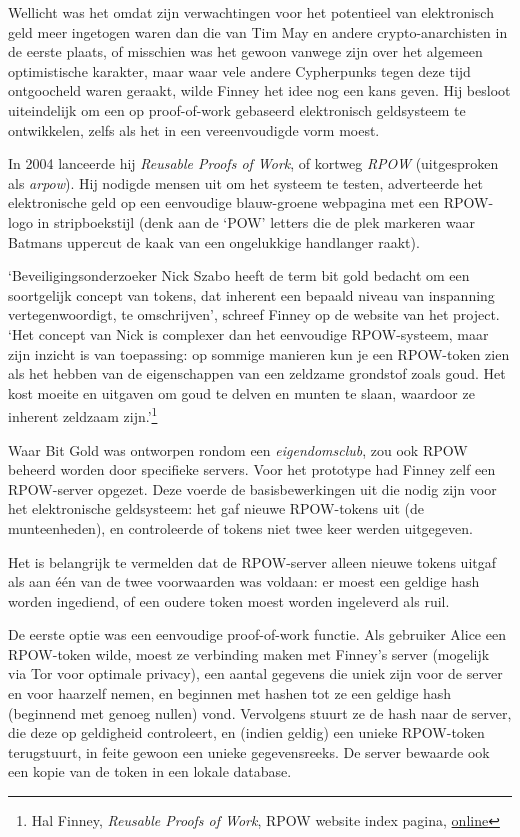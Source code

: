 \documentclass[
  a5paper,
  smalldemyvopaper,11pt,twoside,onecolumn,openright,extrafontsizes,
hidelinks]{memoir}
\begin{document}
Wellicht was het omdat zijn verwachtingen voor het potentieel van
elektronisch geld meer ingetogen waren dan die van Tim May en andere
crypto-anarchisten in de eerste plaats, of misschien was het gewoon
vanwege zijn over het algemeen optimistische karakter, maar waar vele
andere Cypherpunks tegen deze tijd ontgoocheld waren geraakt, wilde
Finney het idee nog een kans geven. Hij besloot uiteindelijk om een op
proof-of-work gebaseerd elektronisch geldsysteem te ontwikkelen, zelfs
als het in een vereenvoudigde vorm moest.

In 2004 lanceerde hij \emph{Reusable Proofs of Work}, of kortweg
\emph{RPOW} (uitgesproken als \emph{arpow}). Hij nodigde mensen uit om
het systeem te testen, adverteerde het elektronische geld op een
eenvoudige blauw-groene webpagina met een RPOW-logo in stripboekstijl
(denk aan de `POW' letters die de plek markeren waar Batmans uppercut de
kaak van een ongelukkige handlanger raakt).

`Beveiligingsonderzoeker Nick Szabo heeft de term bit gold bedacht om
een soortgelijk concept van tokens, dat inherent een bepaald niveau van
inspanning vertegenwoordigt, te omschrijven', schreef Finney op de
website van het project. `Het concept van Nick is complexer dan het
eenvoudige RPOW-systeem, maar zijn inzicht is van toepassing: op sommige
manieren kun je een RPOW-token zien als het hebben van de eigenschappen
van een zeldzame grondstof zoals goud. Het kost moeite en uitgaven om
goud te delven en munten te slaan, waardoor ze inherent zeldzaam
zijn.'\footnote{Hal Finney, \emph{Reusable Proofs of Work}, RPOW website
  index pagina,
  \href{https://web.archive.org/web/20090217090451/http://rpow.net/index.html}{online}}

Waar Bit Gold was ontworpen rondom een \emph{eigendomsclub}, zou ook
RPOW beheerd worden door specifieke servers. Voor het prototype had
Finney zelf een RPOW-server opgezet. Deze voerde de basisbewerkingen uit
die nodig zijn voor het elektronische geldsysteem: het gaf nieuwe
RPOW-tokens uit (de munteenheden), en controleerde of tokens niet twee
keer werden uitgegeven.

Het is belangrijk te vermelden dat de RPOW-server alleen nieuwe tokens
uitgaf als aan één van de twee voorwaarden was voldaan: er moest een
geldige hash worden ingediend, of een oudere token moest worden
ingeleverd als ruil.

De eerste optie was een eenvoudige proof-of-work functie. Als gebruiker
Alice een RPOW-token wilde, moest ze verbinding maken met Finney's
server (mogelijk via Tor voor optimale privacy), een aantal gegevens die
uniek zijn voor de server en voor haarzelf nemen, en beginnen met hashen
tot ze een geldige hash (beginnend met genoeg nullen) vond. Vervolgens
stuurt ze de hash naar de server, die deze op geldigheid controleert, en
(indien geldig) een unieke RPOW-token terugstuurt, in feite gewoon een
unieke gegevensreeks. De server bewaarde ook een kopie van de token in
een lokale database.
\end{document}
